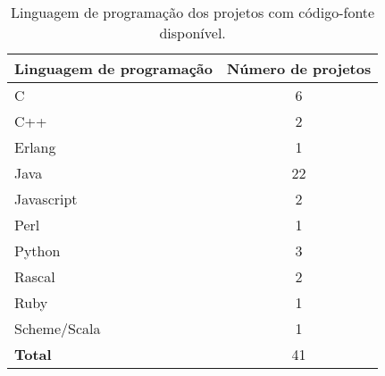 \begin{table}[h]
\caption{Linguagem de programação dos projetos com código-fonte disponível.}
\centering
\begin{tabular}{l c}
  \hline
  {\bf Linguagem de programação} & {\bf Número de projetos} \\
  \hline
  C & 6 \\
  C++ & 2 \\
  Erlang & 1 \\
  Java & 22 \\
  Javascript & 2 \\
  Perl & 1 \\
  Python & 3 \\
  Rascal & 2 \\
  Ruby & 1 \\
  Scheme/Scala & 1 \\
  \hline
  {\bf Total} & 41 \\
  \hline
\end{tabular}
\label{source-code-table}
\end{table}
